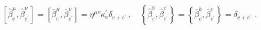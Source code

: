\begin{equation}
\left[ \hat{\beta}_{e}^{\mu },\hat{\beta}_{e^{\prime }}^{\nu }\right] =\left[
\bar{\beta}_{e}^{\mu },\bar{\beta}_{e^{\prime }}^{\nu }\right] =\eta ^{\mu
\nu }\kappa _{e}^{\prime }\delta _{e+e^{\prime }}\,,\quad \left\{ \hat{\beta}%
_{e}^{b},\hat{\beta}_{e^{\prime }}^{c}\right\} =\left\{ \bar{\beta}_{e}^{b},%
\bar{\beta}_{e^{\prime }}^{c}\right\} =\delta _{e+e^{\prime }}\,\,.
\end{equation}%
